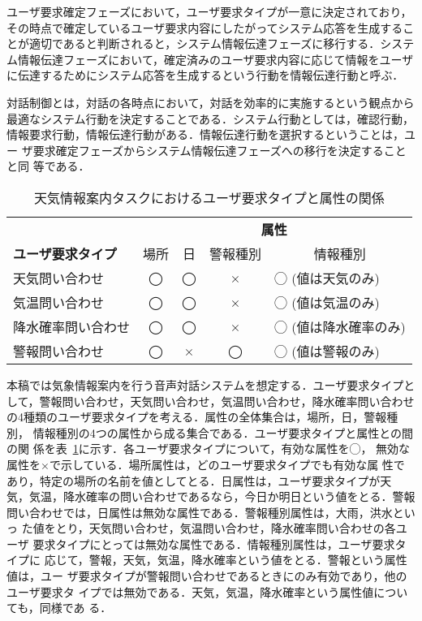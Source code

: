 ユーザ要求確定フェーズにおいて，ユーザ要求タイプが一意に決定されており，
その時点で確定しているユーザ要求内容にしたがってシステム応答を生成するこ
とが適切であると判断されると，システム情報伝達フェーズに移行する．システ
ム情報伝達フェーズにおいて，確定済みのユーザ要求内容に応じて情報をユーザ
に伝達するためにシステム応答を生成するという行動を情報伝達行動と呼ぶ．

対話制御とは，対話の各時点において，対話を効率的に実施するという観点から
最適なシステム行動を決定することである．システム行動としては，確認行動，
情報要求行動，情報伝達行動がある．情報伝達行動を選択するということは，ユー
ザ要求確定フェーズからシステム情報伝達フェーズへの移行を決定することと同
等である．

\begin{table}
\begin{center}
\begin{tabular}{|l||c|c|c|c|}
\hline
& \multicolumn{4}{|c|}{\bf 属性} \\ \cline{2-5} 
\multicolumn{1}{|l||}{\bf ユーザ要求タイプ}
 & \multicolumn{1}{c|}{場所}
 & \multicolumn{1}{c|}{日}
 & \multicolumn{1}{c|}{警報種別}
 & \multicolumn{1}{c|}{情報種別} \\ \hline
天気問い合わせ      & ◯ & ◯ & × & \multicolumn{1}{l|}{◯ (値は天気のみ)} \\ \hline
気温問い合わせ      & ◯ & ◯ & × & \multicolumn{1}{l|}{◯ (値は気温のみ)} \\ \hline
降水確率問い合わせ  & ◯ & ◯ & × & \multicolumn{1}{l|}{◯ (値は降水確率のみ)} \\ \hline
警報問い合わせ      & ◯ & × & ◯ & \multicolumn{1}{l|}{◯ (値は警報のみ)} \\ \hline
\end{tabular}
\end{center}
\caption{天気情報案内タスクにおけるユーザ要求タイプと属性の関係}
\label{tab-task}
\end{table}

本稿では気象情報案内を行う音声対話システムを想定する．ユーザ要求タイプと
して，警報問い合わせ，天気問い合わせ，気温問い合わせ，降水確率問い合わせ
の4種類のユーザ要求タイプを考える．属性の全体集合は，場所，日，警報種別，
情報種別の4つの属性から成る集合である．ユーザ要求タイプと属性との間の関
係を表~\ref{tab-task}に示す．各ユーザ要求タイプについて，有効な属性を◯，
無効な属性を×で示している．場所属性は，どのユーザ要求タイプでも有効な属
性であり，特定の場所の名前を値としてとる．日属性は，ユーザ要求タイプが天
気，気温，降水確率の問い合わせであるなら，今日か明日という値をとる．警報
問い合わせでは，日属性は無効な属性である．警報種別属性は，大雨，洪水といっ
た値をとり，天気問い合わせ，気温問い合わせ，降水確率問い合わせの各ユーザ
要求タイプにとっては無効な属性である．情報種別属性は，ユーザ要求タイプに
応じて，警報，天気，気温，降水確率という値をとる．警報という属性値は，ユー
ザ要求タイプが警報問い合わせであるときにのみ有効であり，他のユーザ要求タ
イプでは無効である．天気，気温，降水確率という属性値についても，同様であ
る．


